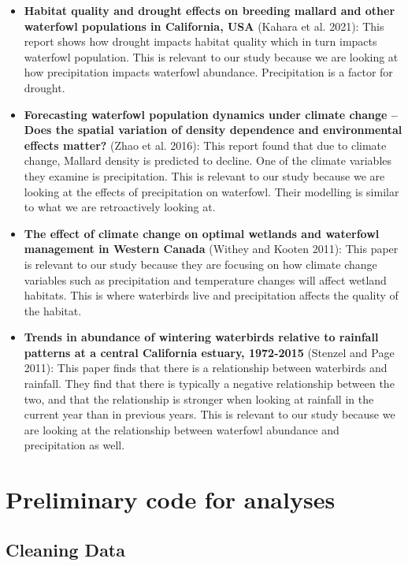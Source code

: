 \documentclass[
  letterpaper,
  DIV=11,
  numbers=noendperiod]{scrartcl}
\begin{document}
\begin{itemize}
\item
  \textbf{Habitat quality and drought effects on breeding mallard and
  other waterfowl populations in California, USA} (Kahara et al. 2021):
  This report shows how drought impacts habitat quality which in turn
  impacts waterfowl population. This is relevant to our study because we
  are looking at how precipitation impacts waterfowl abundance.
  Precipitation is a factor for drought.
\item
  \textbf{Forecasting waterfowl population dynamics under climate change
  -- Does the spatial variation of density dependence and environmental
  effects matter?} (Zhao et al. 2016): This report found that due to
  climate change, Mallard density is predicted to decline. One of the
  climate variables they examine is precipitation. This is relevant to
  our study because we are looking at the effects of precipitation on
  waterfowl. Their modelling is similar to what we are retroactively
  looking at.
\item
  \textbf{The effect of climate change on optimal wetlands and waterfowl
  management in Western Canada} (Withey and Kooten 2011): This paper is
  relevant to our study because they are focusing on how climate change
  variables such as precipitation and temperature changes will affect
  wetland habitats. This is where waterbirds live and precipitation
  affects the quality of the habitat.
\item
  \textbf{Trends in abundance of wintering waterbirds relative to
  rainfall patterns at a central California estuary, 1972-2015} (Stenzel
  and Page 2011): This paper finds that there is a relationship between
  waterbirds and rainfall. They find that there is typically a negative
  relationship between the two, and that the relationship is stronger
  when looking at rainfall in the current year than in previous years.
  This is relevant to our study because we are looking at the
  relationship between waterfowl abundance and precipitation as well.
\end{itemize}

\section{Preliminary code for
analyses}\label{preliminary-code-for-analyses}

\subsection{Cleaning Data}\label{cleaning-data}
\end{document}
